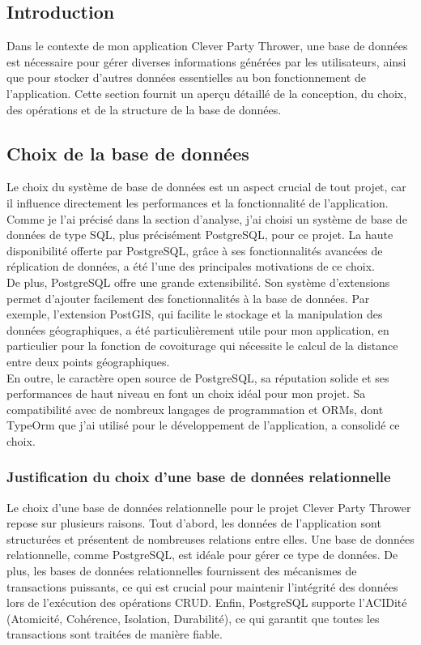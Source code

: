 \subsection{Introduction}\label{subsec:introduction_base_de_donnee}
Dans le contexte de mon application Clever Party Thrower, une base de données est nécessaire pour gérer diverses informations générées par les utilisateurs,
ainsi que pour stocker d'autres données essentielles au bon fonctionnement de l'application.
Cette section fournit un aperçu détaillé de la conception, du choix, des opérations et de la structure de la base de données.

\subsection{Choix de la base de données}\label{subsec:choix-de-la-base-de-donnee}
Le choix du système de base de données est un aspect crucial de tout projet, car il influence directement les performances et la fonctionnalité de l'application.
Comme je l'ai précisé dans la section d'analyse, j'ai choisi un système de base de données de type SQL, plus précisément PostgreSQL, pour ce projet.
La haute disponibilité offerte par PostgreSQL, grâce à ses fonctionnalités avancées de réplication de données, a été l'une des principales motivations de ce choix.\\

De plus, PostgreSQL offre une grande extensibilité.
Son système d'extensions permet d'ajouter facilement des fonctionnalités à la base de données.
Par exemple, l'extension PostGIS, qui facilite le stockage et la manipulation des données géographiques, a été particulièrement utile pour mon application,
en particulier pour la fonction de covoiturage qui nécessite le calcul de la distance entre deux points géographiques.\\

En outre, le caractère open source de PostgreSQL, sa réputation solide et ses performances de haut niveau en font un choix idéal pour mon projet.
Sa compatibilité avec de nombreux langages de programmation et ORMs, dont TypeOrm que j'ai utilisé pour le développement de l'application, a consolidé ce choix.

\subsubsection{Justification du choix d'une base de données relationnelle}\label{subsubsec:justification-choix-relational-db}
Le choix d'une base de données relationnelle pour le projet Clever Party Thrower repose sur plusieurs raisons.
Tout d'abord, les données de l'application sont structurées et présentent de nombreuses relations entre elles.
Une base de données relationnelle, comme PostgreSQL, est idéale pour gérer ce type de données.
De plus, les bases de données relationnelles fournissent des mécanismes de transactions puissants, ce qui est crucial pour maintenir
l'intégrité des données lors de l'exécution des opérations CRUD. Enfin,
PostgreSQL supporte l'ACIDité (Atomicité, Cohérence, Isolation, Durabilité), ce qui garantit que toutes les transactions sont traitées de manière fiable.\\

